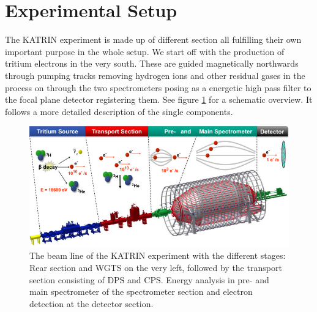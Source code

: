       \section{Experimental Setup}
      \label{ch:The KATRIN experiment:sec:Experimental setup}
      The KATRIN experiment is made up of different section all fulfilling their own important purpose in the whole setup. We start off with the production of tritium electrons in the very south. These are guided magnetically northwards through pumping tracks removing hydrogen ions and other residual gases in the process on through the two spectrometers posing as a energetic high pass filter to the focal plane detector registering them. See figure \ref{fig:beamLine} for a schematic overview. It follows a more detailed description of the single components.
      
      \begin{figure}
			
      		\includegraphics[width = \textwidth]{graphics/katrinExperiment/beamLine.jpg}

      	\caption[KATRIN beam line]{The beam line of the KATRIN experiment with the different stages: Rear section and WGTS on the very left, followed by the transport section consisting of DPS and CPS. Energy analysis in pre- and main spectrometer of the spectrometer section and electron detection at the detector section.}
      	\label{fig:beamLine}
      \end{figure}

      
